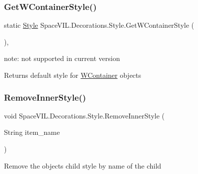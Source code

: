 \subsubsection{\texorpdfstring{Get\+W\+Container\+Style()}{GetWContainerStyle()}}
{\footnotesize\ttfamily static \mbox{\hyperlink{class_space_v_i_l_1_1_decorations_1_1_style}{Style}} Space\+V\+I\+L.\+Decorations.\+Style.\+Get\+W\+Container\+Style (\begin{DoxyParamCaption}{ }\end{DoxyParamCaption})\hspace{0.3cm}{\ttfamily [inline]}, {\ttfamily [static]}}



note\+: not supported in current version 

\begin{DoxyReturn}{Returns}
default style for \mbox{\hyperlink{class_space_v_i_l_1_1_w_container}{W\+Container}} objects 
\end{DoxyReturn}
\mbox{\label{class_space_v_i_l_1_1_decorations_1_1_style_a34f1cc39bddef7663fca7c301256a3e5}} 
\subsubsection{\texorpdfstring{Remove\+Inner\+Style()}{RemoveInnerStyle()}}
{\footnotesize\ttfamily void Space\+V\+I\+L.\+Decorations.\+Style.\+Remove\+Inner\+Style (\begin{DoxyParamCaption}\item[{String}]{item\+\_\+name }\end{DoxyParamCaption})\hspace{0.3cm}{\ttfamily [inline]}}



Remove the object\textquotesingle{}s child style by name of the child 

\mbox{\label{class_space_v_i_l_1_1_decorations_1_1_style_a84dcc9ea332cd7950e166307050124a0}} 
